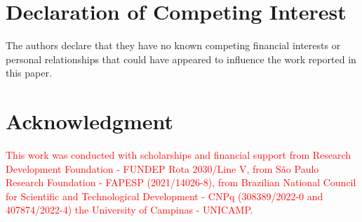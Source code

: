 \documentclass[preprint,10pt]{elsarticle}
\begin{document}
\section*{Declaration of Competing Interest}
The authors declare that they have no known competing financial interests or personal relationships that could have appeared to influence the work reported in this paper.


\section*{Acknowledgment}
\textcolor{red}{This work was conducted with scholarships and financial support from Research Development Foundation - FUNDEP Rota 2030/Line V, from São Paulo Research Foundation - FAPESP (2021/14026-8), from Brazilian National Council for Scientific and Technological Development - CNPq (308389/2022-0 and 407874/2022-4) the University of Campinas - UNICAMP.}



%  

\end{document}
